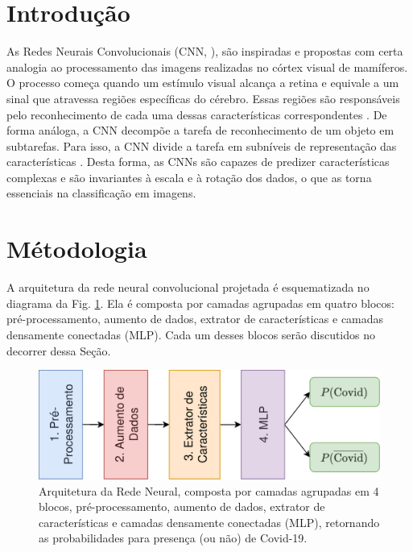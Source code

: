 \documentclass[a4,12pt]{horizon-theme}
\begin{document}
\horizonCover




\newpage

\onehalfspacing






\section{Introdução}
As Redes Neurais Convolucionais (CNN, \cite{lecun2015deep}), são inspiradas e propostas com certa analogia ao processamento das imagens realizadas no córtex visual de mamíferos. O processo começa quando um estímulo visual alcança a retina e equivale a um sinal que atravessa regiões específicas do cérebro. Essas regiões são responsáveis pelo reconhecimento de cada uma dessas características correspondentes \citep{karpathy2016convolutional}. De forma análoga, a CNN decompõe a tarefa de reconhecimento de um objeto em subtarefas. Para isso, a CNN divide a tarefa em subníveis de representação das características \citep{lecun2015deep}. Desta forma, as CNNs são capazes de predizer características complexas e são invariantes à escala e à rotação dos dados, o que as torna essenciais na classificação em imagens.



\section{Métodologia}
A arquitetura da rede neural convolucional projetada é esquematizada no diagrama da Fig. \ref{fig:arquitetura}. Ela é composta por camadas agrupadas em quatro blocos: pré-processamento, aumento de dados, extrator de características e camadas densamente conectadas (MLP). Cada um desses blocos serão discutidos no decorrer dessa Seção.

\begin{figure}[!ht]
  \centering
  \includegraphics[width=\textwidth]{figures/diagrama-arquitetura.png}
  \caption{Arquitetura da Rede Neural, composta por camadas agrupadas em 4 blocos, pré-processamento, aumento de dados, extrator de características e camadas densamente conectadas (MLP), retornando as probabilidades para presença (ou não) de Covid-19.}
  \label{fig:arquitetura}
\end{figure}
\end{document}
